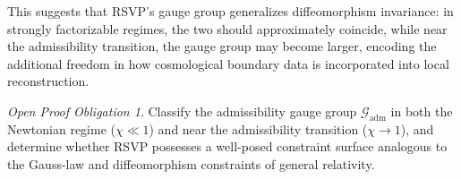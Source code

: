 \documentclass[11pt, a4paper]{article}
\theoremstyle{plain}
\theoremstyle{definition}
\theoremstyle{remark}
\newtheorem{obligation}[theorem]{Open Proof Obligation}
\begin{document}
This suggests that RSVP's gauge group generalizes diffeomorphism invariance: in
strongly factorizable regimes, the two should approximately coincide, while near the
admissibility transition, the gauge group may become larger, encoding the additional
freedom in how cosmological boundary data is incorporated into local reconstruction.

\begin{obligation}
\label{obl:gauge}
Classify the admissibility gauge group $\mathcal{G}_{\mathrm{adm}}$ in both the
Newtonian regime ($\chi \ll 1$) and near the admissibility transition ($\chi \to 1$),
and determine whether RSVP possesses a well-posed constraint surface analogous to the
Gauss-law and diffeomorphism constraints of general relativity.
\end{obligation}

\newpage
\end{document}
